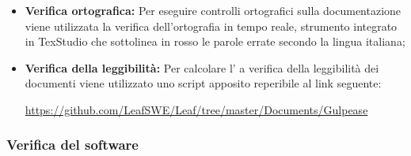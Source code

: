 \documentclass[../NormediProgetto.tex]{subfiles}
\begin{document}
	\begin{itemize}
		\item \textbf{Verifica ortografica:} Per eseguire controlli ortografici sulla documentazione viene utilizzata la verifica dell’ortografia in tempo reale, strumento integrato in TexStudio che sottolinea in rosso le parole errate secondo la lingua italiana;
		
		\item \textbf{Verifica della leggibilità:} Per calcolare l' a verifica della leggibilità dei documenti viene utilizzato uno script apposito reperibile al link seguente:
		
		\begin{center}
			\centerline{\url{https://github.com/LeafSWE/Leaf/tree/master/Documents/Gulpease}}
		\end{center}
	\end{itemize}
	
	\subsubsection{Verifica del software}
	
\end{document}
